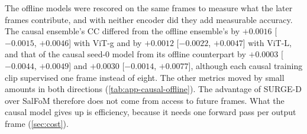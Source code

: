 The offline models were rescored on the same frames to measure what the later
frames contribute, and with neither encoder did they add measurable accuracy.
The causal ensemble's \acrshort{CC} differed from the offline ensemble's by $+0.0016$
[$-0.0015$, $+0.0046$] with \acrshort{ViT}-g and by $+0.0012$ [$-0.0022$, $+0.0047$] with
\acrshort{ViT}-L, and that of the causal seed-0 model from its offline counterpart by
$+0.0003$ [$-0.0044$, $+0.0049$] and $+0.0030$ [$-0.0014$, $+0.0077$], although each
causal training clip supervised one frame instead of eight. The other metrics
moved by small amounts in both directions (\cref{tab:app-causal-offline}). The advantage of SURGE-D over SalFoM
therefore does not come from access to future frames. What the causal model gives
up is efficiency, because it needs one forward pass per output frame
(\cref{sec:cost}).

